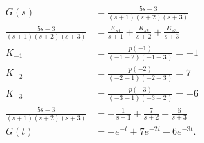 
\begin{exa}
  \begin{align*}
    G(s) &= \frac{5s + 3}{(s+1)(s+2)(s+3)} \\
    \frac{5s+3}{(s+1)(s+2)(s+3)} &= \frac{K_{s1}}{s+1} + \frac{K_{s 2}}{s+ 2} + \frac{K_{s 3}}{s + 3} \\
    K_{-1} &= \frac{p(-1)}{(-1+2)(-1+3)} = -1\\
    K_{-2} &= \frac{p(-2)}{(-2+1)(-2+3)} = 7 \\
    K_{-3} &= \frac{p(-3)}{(-3+1)(-3+2)} = -6\\
    \frac{5s + 3}{(s+1) (s+2)(s+3)} &= - \frac{1}{s+1} + \frac{7}{s+2} - \frac{6}{s+3} \\
    G(t) &= -e^{-t} + 7 e^{-2t} - 6 e^{-3t}
  .\end{align*}
\end{exa}

